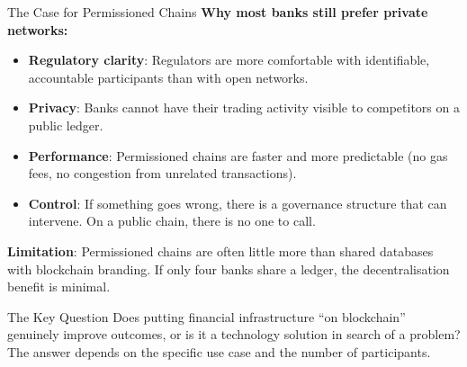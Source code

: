 \documentclass[10pt]{beamer}
\begin{document}
\begin{frame}{The Case for Permissioned Chains}
  \textbf{Why most banks still prefer private networks:}
  \begin{itemize}
    \item \textbf{Regulatory clarity}: Regulators are more comfortable with identifiable, accountable participants than with open networks.
    \item \textbf{Privacy}: Banks cannot have their trading activity visible to competitors on a public ledger.
    \item \textbf{Performance}: Permissioned chains are faster and more predictable (no gas fees, no congestion from unrelated transactions).
    \item \textbf{Control}: If something goes wrong, there is a governance structure that can intervene. On a public chain, there is no one to call.
  \end{itemize}
  
  \vspace{0.5em}
  \textbf{Limitation}: Permissioned chains are often little more than shared databases with blockchain branding. If only four banks share a ledger, the decentralisation benefit is minimal.
  
  \vspace{0.5em}
  \begin{block}{The Key Question}
    Does putting financial infrastructure ``on blockchain'' genuinely improve outcomes, or is it a technology solution in search of a problem? The answer depends on the specific use case and the number of participants.
  \end{block}
\end{frame}
\end{document}
